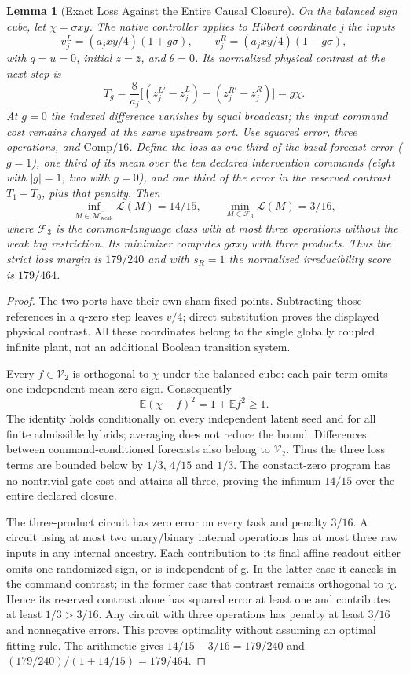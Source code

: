 \documentclass[11pt,a4paper]{article}
\newtheorem{lemma}[theorem]{Lemma}
\theoremstyle{definition}
\newcommand{\WeakFam}{\mathcal{M}_{\mathrm{weak}}}
\newcommand{\WeakClosure}{\overline{\WeakFam}}
\begin{document}
\begin{lemma}[Exact Loss Against the Entire Causal Closure]
\label{lem:indexed-causal-closure-loss}
On the balanced sign cube, let $\chi=\sigma xy$. The native controller applies
to Hilbert coordinate j the inputs
\[
 v_j^L=(a_jxy/4)(1+g\sigma),\qquad
 v_j^R=(a_jxy/4)(1-g\sigma),
\]
with $q=u=0$, initial $z=\bar z$, and $\theta=0$. Its normalized physical
contrast at the next step is
\[
 T_g=\frac8{a_j}\bigl[(z_j^{L\prime}-\bar z_j^L)
                         -(z_j^{R\prime}-\bar z_j^R)\bigr]=g\chi.
\]
At $g=0$ the indexed difference vanishes by equal broadcast; the input command
cost remains charged at the same upstream port. Use squared error, three
operations, and $\mathrm{Comp}/16$. Define the loss as one third of the basal
forecast error ($g=1$), one third of its mean over the ten declared intervention
commands (eight with $|g|=1$, two with $g=0$), and one third of the error in
the reserved contrast $T_1-T_0$, plus that penalty. Then
\[
 \inf_{M\in\WeakClosure}\mathcal L(M)=14/15,\qquad
 \min_{M\in\mathcal F_3}\mathcal L(M)=3/16,
\]
where $\mathcal F_3$ is the common-language class with at most three operations
without the weak tag restriction. Its minimizer computes $g\sigma xy$ with
three products. Thus the strict loss margin is $179/240$ and with $s_R=1$
the normalized irreducibility score is $179/464$.
\end{lemma}
\begin{proof}
The two ports have their own sham fixed points. Subtracting those references
in a q-zero step leaves $v/4$; direct substitution proves the displayed
physical contrast. All these coordinates belong to the single globally
coupled infinite plant, not an additional Boolean transition system.

Every $f\in\mathcal V_2$ is orthogonal to $\chi$ under the balanced cube:
each pair term omits one independent mean-zero sign. Consequently
\[
 \mathbb E(\chi-f)^2=1+\mathbb E f^2\ge1.
\]
The identity holds conditionally on every independent latent seed and for
all finite admissible hybrids; averaging does not reduce the bound. Differences
between command-conditioned forecasts also belong to $\mathcal V_2$.
Thus the three loss terms are bounded below by $1/3$, $4/15$ and $1/3$.
The constant-zero program has no nontrivial gate cost and attains all three,
proving the infimum $14/15$ over the entire declared closure.

The three-product circuit has zero error on every task and penalty $3/16$.
A circuit using at most two unary/binary internal operations has at most
three raw inputs in any internal ancestry. Each contribution to its final
affine readout either omits one randomized sign, or is independent of g.
In the latter case it cancels in the command contrast; in the former case
that contrast remains orthogonal to $\chi$. Hence its reserved contrast
alone has squared error at least one and contributes at least $1/3>3/16$.
Any circuit with three operations has penalty at least $3/16$ and nonnegative
errors. This proves optimality without assuming an optimal fitting rule.
The arithmetic gives $14/15-3/16=179/240$ and
$(179/240)/(1+14/15)=179/464$.
\end{proof}
\end{document}
